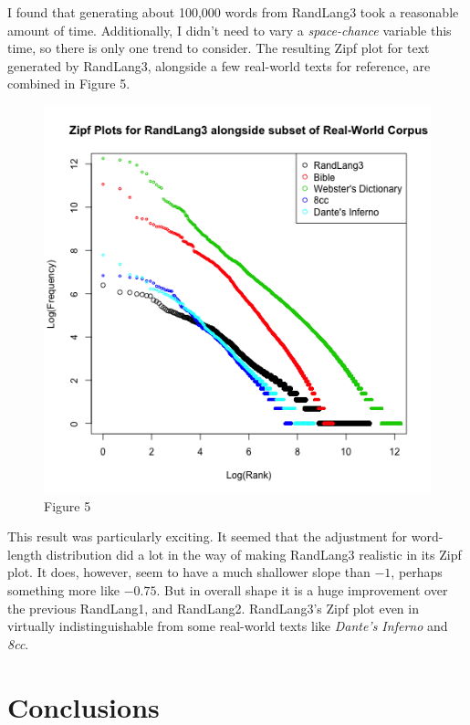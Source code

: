 \documentclass{article}
\begin{document}
I found that generating about 100,000 words from RandLang3 took a reasonable amount of time. Additionally, I didn't need to vary a \textit{space-chance} variable this time, so there is only one trend to consider. The resulting Zipf plot for text generated by RandLang3, alongside a few real-world texts for reference, are combined in Figure 5.


\begin{figure}[h]
\centering
\includegraphics[width=13cm,keepaspectratio]{randlengths-real.png}
\captionsetup{labelformat=empty} \caption{Figure 5}
\end{figure}


This result was particularly exciting. It seemed that the adjustment for word-length distribution did a lot in the way of making RandLang3 realistic in its Zipf plot. It does, however, seem to have a much shallower slope than $  -1  $, perhaps something more like $  -0.75  $. But in overall shape it is a huge improvement over the previous RandLang1, and RandLang2. RandLang3's Zipf plot even in virtually indistinguishable from some real-world texts like \textit{Dante's Inferno} and \textit{8cc}.

\section{Conclusions}
\end{document}

